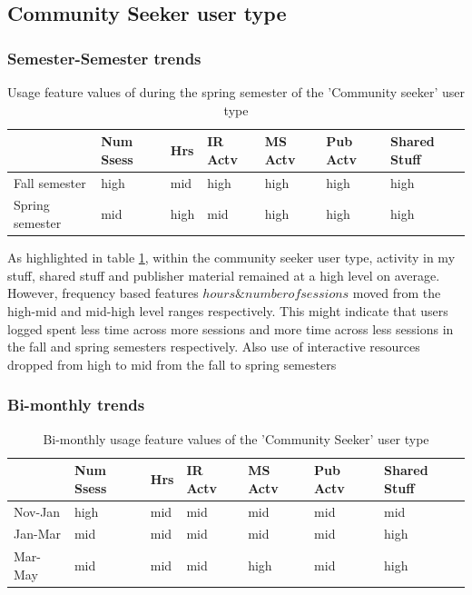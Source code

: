 \documentclass{acm_proc_article-sp}
\begin{document}
\subsection{Community Seeker user type}

\subsubsection{Semester-Semester trends}

\begin{table}
\caption{Usage feature values of during the spring semester of the 'Community seeker' user type}
\label{cluster2month}
\begin{tabular}{|p{1.5cm}|p{0.6cm}|p{0.6cm}|p{0.6cm}|p{0.6cm}|p{0.8cm}|p{0.8cm}|}
 & Num Ssess & Hrs & IR Actv & MS Actv & Pub Actv & Shared Stuff \\ \hline
Fall  semester & high & mid  & high & high & high & high \\ \hline
Spring semester & mid & high  & mid & high & high & high \\ \hline
\end{tabular}
\end{table}

As highlighted in table \ref{cluster2month}, within the community seeker user type, activity in my stuff, shared stuff and publisher material remained at a high level on average. However, frequency based features \(hours \& number of sessions\) moved from the high-mid and mid-high level ranges respectively. This might indicate that users logged spent less time across more sessions and more time across less sessions in the fall and spring semesters respectively. Also use of interactive resources dropped from high to mid from the fall to spring semesters

\subsubsection{Bi-monthly trends}
\begin{table}
\caption{Bi-monthly usage feature values of the 'Community Seeker' user type}
\label{cluster1bimonthly}
\begin{tabular}{|p{1.5cm}|p{0.6cm}|p{0.6cm}|p{0.6cm}|p{0.6cm}|p{0.8cm}|p{0.8cm}|}
 & Num Ssess & Hrs & IR Actv & MS Actv & Pub Actv & Shared Stuff \\ \hline
Nov-Jan & high & mid  & mid & mid & mid & mid \\ \hline
Jan-Mar & mid & mid  & mid & mid & mid & high \\ \hline
Mar-May & mid & mid  & mid & high & mid & high \\ \hline
\end{tabular}
\end{table}
\end{document}
